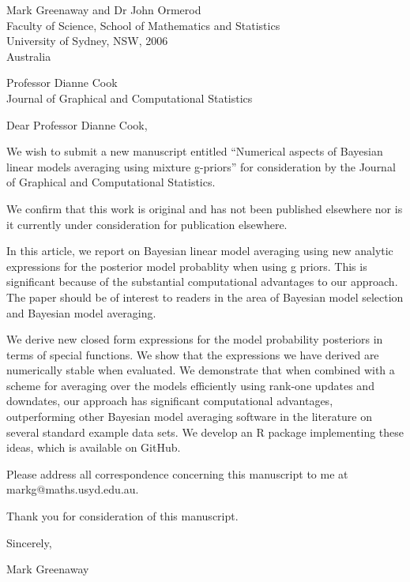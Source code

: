 \documentclass{letter}
\begin{document}
Mark Greenaway and Dr John Ormerod \\
Faculty of Science, School of Mathematics and Statistics \\
University of Sydney, NSW, 2006 \\
Australia

Professor Dianne Cook \\
Journal of Graphical and Computational Statistics

Dear Professor Dianne Cook,

We wish to submit a new manuscript entitled ``Numerical aspects of Bayesian linear models averaging using
mixture g-priors'' for consideration by the Journal of Graphical and Computational Statistics.

We confirm that this work is original and has not been published elsewhere nor is it currently under
consideration for publication elsewhere.

In this article, we report on Bayesian linear model averaging using new analytic expressions for the
posterior model probablity when using g priors. This is significant because of the substantial computational
advantages to our approach. The paper should be of interest to readers in the area of Bayesian model selection
and Bayesian model averaging.

We derive new closed form expressions for the model probability posteriors in terms of special functions.
We show that the expressions we have derived are numerically stable when evaluated. We demonstrate that when 
combined with a scheme for averaging over the models efficiently using rank-one updates and downdates,
our approach has significant computational advantages, outperforming other Bayesian model averaging software
in the literature on several standard example data sets. We develop an R package implementing these ideas,
which is available on GitHub.

Please address all correspondence concerning this manuscript to me at markg@maths.usyd.edu.au.

Thank you for consideration of this manuscript.

Sincerely,

Mark Greenaway
\end{document}
